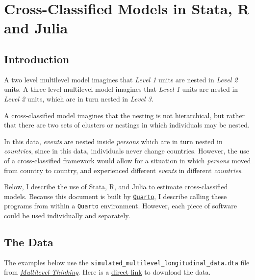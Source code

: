 \documentclass[
  letterpaper,
  DIV=11,
  numbers=noendperiod]{scrreprt}
\begin{document}

\hypertarget{cross-classified-models-in-stata-r-and-julia}{%
\chapter{Cross-Classified Models in Stata, R and
Julia}\label{cross-classified-models-in-stata-r-and-julia}}

\hypertarget{introduction-1}{%
\section{Introduction}\label{introduction-1}}

A two level multilevel model imagines that \emph{Level 1} units are
nested in \emph{Level 2} units. A three level multilevel model imagines
that \emph{Level 1} units are nested in \emph{Level 2} units, which are
in turn nested in \emph{Level 3}.

A cross-classified model imagines that the nesting is not hierarchical,
but rather that there are two sets of clusters or nestings in which
individuals may be nested.

In this data, \emph{events} are nested inside \emph{persons} which are
in turn nested in \emph{countries}, since in this data, individuals
never change countries. However, the use of a cross-classified framework
would allow for a situation in which \emph{persons} moved from country
to country, and experienced different \emph{events} in different
\emph{countries}.

Below, I describe the use of \href{https://www.stata.com/}{Stata},
\href{https://www.r-project.org/}{R}, and
\href{https://www.julialang.org/}{Julia} to estimate cross-classified
models. Because this document is built by
\href{https://quarto.org/}{\texttt{Quarto}}, I describe calling these
programs from within a \texttt{Quarto} environment. However, each piece
of software could be used individually and separately.

\hypertarget{the-data-1}{%
\section{The Data}\label{the-data-1}}

The examples below use the
\texttt{simulated\_multilevel\_longitudinal\_data.dta} file from
\href{https://agrogan1.github.io/multilevel-thinking/simulated-multi-country-data.html}{\emph{Multilevel
Thinking}}. Here is a
\href{https://github.com/agrogan1/multilevel-multilingual/raw/main/simulated_multilevel_longitudinal_data.dta}{direct
link} to download the data.
\end{document}
